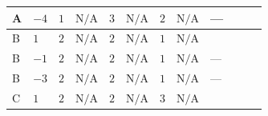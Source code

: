 \documentclass[8pt]{article}
\begin{document}
\begin{landscape}
\begin{longtable}{@{}llcccccc >{\raggedright\arraybackslash}p{0.21\linewidth} >{\raggedright\arraybackslash}p{0.21\linewidth} >{\raggedright\arraybackslash}p{0.21\linewidth}@{}}
\midrule
A & $-4$ & $1$ & $\text{N/A}$ & $3$ & $\text{N/A}$ & $2$ & $\text{N/A}$ & --- & \scriptsize\adjustbox{max width=\linewidth}{$\begin{gathered} +6 {\lambda_{12}^{(1)}}^2\end{gathered}$} & \scriptsize\adjustbox{max width=\linewidth}{$\begin{gathered} +4 {\lambda_{HS_1}^{(1)}}^2\end{gathered}$} \\
\midrule
B & $1$ & $2$ & $\text{N/A}$ & $2$ & $\text{N/A}$ & $1$ & $\text{N/A}$ & \scriptsize\adjustbox{max width=\linewidth}{$\begin{gathered} 8 {\lambda_{X_{15}}} \left({\lambda_{X_{15}}}\right)^{*}\end{gathered}$} & \scriptsize\adjustbox{max width=\linewidth}{$\begin{gathered} +4 {\lambda_{12}^{(1)}}^2\end{gathered}$} & \scriptsize\adjustbox{max width=\linewidth}{$\begin{gathered} +4 {\lambda_{HS_1}^{(1)}}^2\end{gathered}$} \\
\midrule
B & $-1$ & $2$ & $\text{N/A}$ & $2$ & $\text{N/A}$ & $1$ & $\text{N/A}$ & --- & \scriptsize\adjustbox{max width=\linewidth}{$\begin{gathered} +4 {\lambda_{12}^{(1)}}^2\end{gathered}$} & \scriptsize\adjustbox{max width=\linewidth}{$\begin{gathered} +4 {\lambda_{HS_1}^{(1)}}^2\end{gathered}$} \\
\midrule
B & $-3$ & $2$ & $\text{N/A}$ & $2$ & $\text{N/A}$ & $1$ & $\text{N/A}$ & --- & \scriptsize\adjustbox{max width=\linewidth}{$\begin{gathered} +4 {\lambda_{12}^{(1)}}^2\end{gathered}$} & \scriptsize\adjustbox{max width=\linewidth}{$\begin{gathered} +4 {\lambda_{HS_1}^{(1)}}^2\end{gathered}$} \\
\midrule
C & $1$ & $2$ & $\text{N/A}$ & $2$ & $\text{N/A}$ & $3$ & $\text{N/A}$ & \scriptsize\adjustbox{max width=\linewidth}{$\begin{gathered} 8 {\lambda_{X_{15}}} \left({\lambda_{X_{15}}}\right)^{*}\end{gathered}$} & \scriptsize\adjustbox{max width=\linewidth}{$\begin{gathered} +4 {\lambda_{12}^{(1)}}^2\end{gathered}$} & \scriptsize\adjustbox{max width=\linewidth}{$\begin{gathered} +4 {\lambda_{HS_1}^{(1)}}^2\end{gathered}$} \\

\end{longtable}
\end{landscape}
\end{document}

